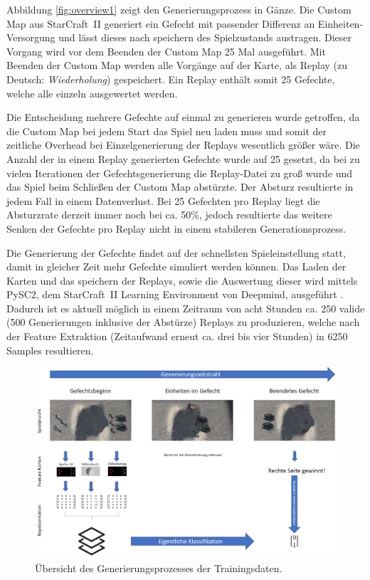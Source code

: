 Abbildung \ref{fig:overview1} zeigt den Generierungsprozess in Gänze. Die Custom Map aus StarCraft~II generiert ein Gefecht mit passender Differenz an Einheiten-Versorgung und lässt dieses nach speichern des Spielzustands austragen. Dieser Vorgang wird vor dem Beenden der Custom Map 25 Mal ausgeführt. Mit Beenden der Custom Map werden alle Vorgänge auf der Karte, als Replay (zu Deutsch: \textit{Wiederholung}) gespeichert. Ein Replay enthält somit 25 Gefechte, welche alle einzeln ausgewertet werden. 

Die Entscheidung mehrere Gefechte auf einmal zu generieren wurde getroffen, da die Custom Map bei jedem Start das Spiel neu laden muss und somit der zeitliche Overhead bei Einzelgenerierung der Replays wesentlich größer wäre. Die Anzahl der in einem Replay generierten Gefechte wurde auf 25 gesetzt, da bei zu vielen Iterationen der Gefechtsgenerierung die Replay-Datei zu groß wurde und das Spiel beim Schließen der Custom Map abstürzte. Der Absturz resultierte in jedem Fall in einem Datenverlust. Bei 25 Gefechten pro Replay liegt die Absturzrate derzeit immer noch bei ca. 50\%, jedoch resultierte das weitere Senken der Gefechte pro Replay nicht in einem stabileren Generationsprozess. 

Die Generierung der Gefechte findet auf der schnellsten Spieleinstellung statt, damit in gleicher Zeit mehr Gefechte simuliert werden können. Das Laden der Karten und das speichern der Replays, sowie die Auswertung dieser wird mittels PySC2, dem StarCraft~II Learning Environment von Deepmind, ausgeführt \parencite{DBLP:journals/corr/abs-1708-04782}. Dadurch ist es aktuell möglich in einem Zeitraum von acht Stunden ca. 250 valide (500 Generierungen inklusive der Abstürze) Replays zu produzieren, welche nach der Feature Extraktion (Zeitaufwand erneut ca. drei bis vier Stunden) in 6250 Samples resultieren. 

\newpage
\begin{figure}[H]
\thispagestyle{empty}
\centering
\includegraphics[angle=90,scale=0.6]{pictures/grafiken/Folie1}
\caption{Übersicht des Generierungsprozesses der Trainingsdaten.}
\label{fig:overview2}
\end{figure}

